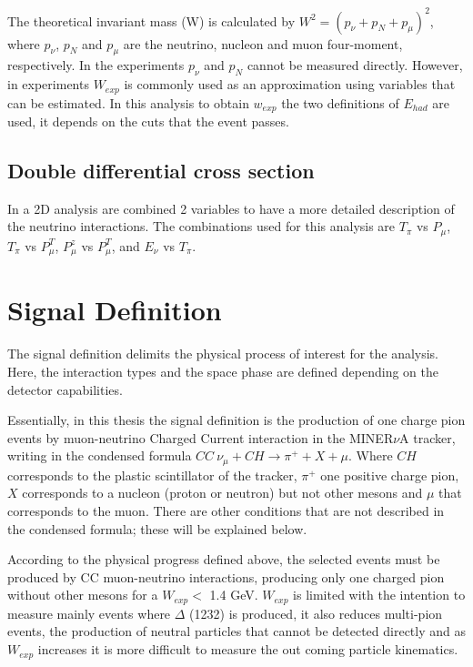The theoretical invariant mass (W) is calculated by $W^2=(p_\nu+p_N+p_\mu)^2$, where $p_\nu$, $p_N$ and $p_\mu$ are the neutrino, nucleon and muon four-moment, respectively. In the experiments $p_\nu$ and $p_N$ cannot be measured directly. However, in experiments $W_{exp}$ is commonly used as an approximation using variables that can be estimated. In this analysis to obtain $w_{exp}$ the two definitions of $E_{had}$ are used, it depends on the cuts that the event passes.  

\subsection{Double differential cross section}
\label{Cap:Analysis:Variables:2DAnalysis}

In a 2D analysis are combined 2 variables to have a more detailed description of the neutrino interactions. The combinations used for this analysis are $T_\pi$ vs $P_\mu$, $T_\pi$ vs $P^T_\mu$, $P^z_\mu$ vs $P^T_\mu$, and $E_\nu$ vs $T_\pi$.




\section{Signal Definition}
\label{Cap:Analysis:SignalDefinition}

The signal definition delimits the physical process of interest for the analysis. Here, the interaction types and the space phase are defined depending on the detector capabilities.

Essentially, in this thesis the signal definition is the production of one charge pion events by muon-neutrino Charged Current interaction in the MINER$\nu$A tracker, writing in the condensed formula $CC\ \nu_\mu+CH\xrightarrow{}\pi^+ + X + \mu$. Where $CH$ corresponds to the plastic scintillator of the tracker, $\pi^+$ one positive charge pion, $X$ corresponds to a nucleon (proton or neutron) but not other mesons and $\mu$ that corresponds to the muon. There are other conditions that are not described in the condensed formula; these will be explained below. 

According to the physical progress defined above, the selected events must be produced by CC muon-neutrino interactions, producing only one charged pion without other mesons for a $W_{exp} <$ 1.4 GeV. $W_{exp}$ is limited with the intention to measure mainly events where $\Delta$ (1232) is produced, it also reduces multi-pion events, the production of neutral particles that cannot be detected directly and as $W_{exp}$ increases it is more difficult to measure the out coming particle kinematics. 

